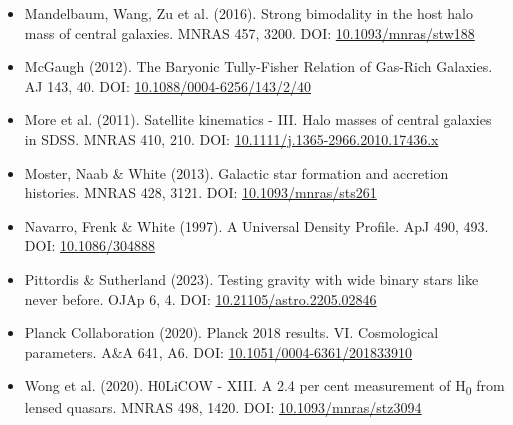 \documentclass[11pt,a4paper]{article}
\begin{document}
\begin{itemize}
  \item Mandelbaum, Wang, Zu et al. (2016). Strong bimodality in the host halo mass of central galaxies. MNRAS 457, 3200. DOI: \href{https://doi.org/10.1093/mnras/stw188}{10.1093/\allowbreak{}mnras/\allowbreak{}stw188}
  \item McGaugh (2012). The Baryonic Tully-Fisher Relation of Gas-Rich Galaxies. AJ 143, 40. DOI: \href{https://doi.org/10.1088/0004-6256/143/2/40}{10.1088/\allowbreak{}0004-6256/\allowbreak{}143/\allowbreak{}2/\allowbreak{}40}
  \item More et al. (2011). Satellite kinematics  -  III. Halo masses of central galaxies in SDSS. MNRAS 410, 210. DOI: \href{https://doi.org/10.1111/j.1365-2966.2010.17436.x}{10.1111/\allowbreak{}j.1365-2966.2010.17436.x}
  \item Moster, Naab \& White (2013). Galactic star formation and accretion histories. MNRAS 428, 3121. DOI: \href{https://doi.org/10.1093/mnras/sts261}{10.1093/\allowbreak{}mnras/\allowbreak{}sts261}
  \item Navarro, Frenk \& White (1997). A Universal Density Profile. ApJ 490, 493. DOI: \href{https://doi.org/10.1086/304888}{10.1086/\allowbreak{}304888}
  \item Pittordis \& Sutherland (2023). Testing gravity with wide binary stars like never before. OJAp 6, 4. DOI: \href{https://doi.org/10.21105/astro.2205.02846}{10.21105/\allowbreak{}astro.2205.02846}
  \item Planck Collaboration (2020). Planck 2018 results. VI. Cosmological parameters. A\&A 641, A6. DOI: \href{https://doi.org/10.1051/0004-6361/201833910}{10.1051/\allowbreak{}0004-6361/\allowbreak{}201833910}
  \item Wong et al. (2020). H0LiCOW  -  XIII. A 2.4 per cent measurement of H\textsubscript{0} from lensed quasars. MNRAS 498, 1420. DOI: \href{https://doi.org/10.1093/mnras/stz3094}{10.1093/\allowbreak{}mnras/\allowbreak{}stz3094}
\end{itemize}
\end{document}
